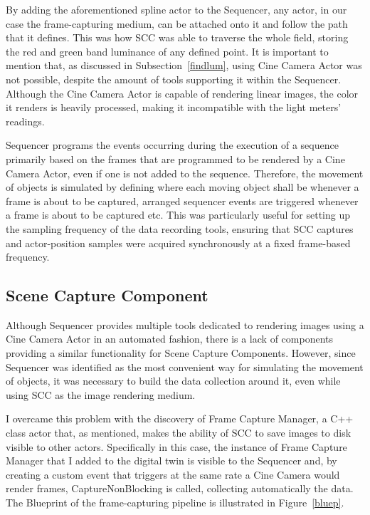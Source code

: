 By adding the aforementioned spline actor to the Sequencer, any actor, in our case the frame-capturing medium, can be attached onto it and follow the path that it defines. This was how SCC was able to traverse the whole field, storing the red and green band luminance of any defined point. It is important to mention that, as discussed in Subsection~\ref{findlum}, using Cine Camera Actor was not possible, despite the amount of tools supporting it within the Sequencer. Although the Cine Camera Actor is capable of rendering linear images, the color it renders is heavily processed, making it incompatible with the light meters' readings.

Sequencer programs the events occurring during the execution of a sequence primarily based on the frames that are programmed to be rendered by a Cine Camera Actor, even if one is not added to the sequence. Therefore, the movement of objects is simulated by defining where each moving object shall be whenever a frame is about to be captured, arranged sequencer events are triggered whenever a frame is about to be captured etc. This was particularly useful for setting up the sampling frequency of the data recording tools, ensuring that SCC captures and actor-position samples were acquired synchronously at a fixed frame-based frequency.

\subsection{Scene Capture Component}

Although Sequencer provides multiple tools dedicated to rendering images using a Cine Camera Actor in an automated fashion, there is a lack of components providing a similar functionality for Scene Capture Components. However, since Sequencer was identified as the most convenient way for simulating the movement of objects, it was necessary to build the data collection around it, even while using SCC as the image rendering medium.

I overcame this problem with the discovery of Frame Capture Manager, a C++ class actor that, as mentioned, makes the ability of SCC to save images to disk visible to other actors. Specifically in this case, the instance of Frame Capture Manager that I added to the digital twin is visible to the Sequencer and, by creating a custom event that triggers at the same rate a Cine Camera would render frames, CaptureNonBlocking is called, collecting automatically the data. The Blueprint of the frame-capturing pipeline is illustrated in Figure~\ref{bluep}.

